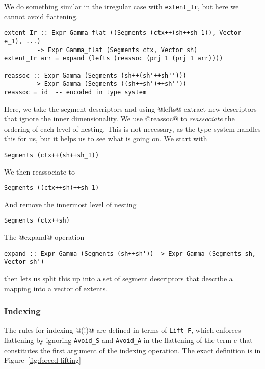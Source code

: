 We do something similar in the irregular case with \lstinline[style=ndp]{extent_Ir}, but here we cannot avoid flattening.
%
\begin{lstlisting}[style=ndp]
extent_Ir :: Expr Gamma_flat ((Segments (ctx++(sh++sh_1)), Vector e_1), ...)
         -> Expr Gamma_flat (Segments ctx, Vector sh)
extent_Ir arr = expand (lefts (reassoc (prj 1 (prj 1 arr))))

reassoc :: Expr Gamma (Segments (sh++(sh'++sh'')))
        -> Expr Gamma (Segments ((sh++sh')++sh''))
reassoc = id  -- encoded in type system
\end{lstlisting}
%
Here, we take the segment descriptors and using @lefts@ extract new descriptors that ignore the inner dimensionality. We use @reassoc@ to \emph{reassociate} the ordering of each level of nesting. This is not necessary, as the type system handles this for us, but it helps us to see what is going on. We start with
%
\begin{lstlisting}[style=ndp]
Segments (ctx++(sh++sh_1))
\end{lstlisting}
%
We then reassociate to
%
\begin{lstlisting}[style=ndp]
Segments ((ctx++sh)++sh_1)
\end{lstlisting}
%
And remove the innermost level of nesting
%
\begin{lstlisting}[style=ndp]
Segments (ctx++sh)
\end{lstlisting}
%
The @expand@ operation
%
\begin{lstlisting}[style=ndp]
expand :: Expr Gamma (Segments (sh++sh')) -> Expr Gamma (Segments sh, Vector sh')
\end{lstlisting}
%
then lets us split this up into a set of segment descriptors that describe a mapping into a vector of extents.

\subsubsection{Indexing}
The rules for indexing @(!)@ are defined in terms of \lstinline[style=ndp]{Lift_F}, which enforces flattening by ignoring \lstinline[style=ndp]{Avoid_S} and \lstinline[style=ndp]{Avoid_A} in the flattening of the term $e$ that constitutes the first argument of the indexing operation. The exact definition is in Figure~\ref{fig:forced-lifting}

